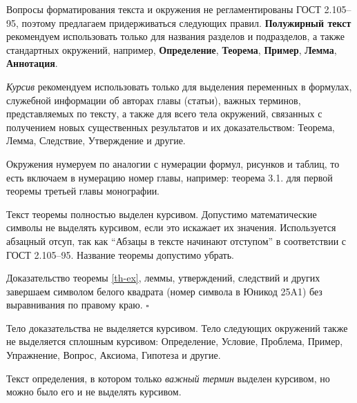 \begin{refsection}
Вопросы форматирования текста и окружения не регламентированы ГОСТ 2.105--95, поэтому предлагаем придерживаться следующих правил.
\textbf{Полужирный текст} рекомендуем использовать только для названия разделов и подразделов, а также стандартных окружений, например, \textbf{Определение}, \textbf{Теорема}, \textbf{Пример}, \textbf{Лемма}, \textbf{Аннотация}.


\textit{Курсив} рекомендуем использовать только для выделения переменных в формулах, служебной информации об авторах главы (статьи), важных терминов, представляемых по тексту, а также для всего тела окружений, связанных с получением новых существенных результатов и их доказательством: Теорема, Лемма, Следствие, Утверждение и другие.

Окружения нумеруем по аналогии с нумерации формул, рисунков и таблиц, то есть включаем в нумерацию номер главы, например:
теорема 3.1. для первой теоремы третьей главы монографии.  



\begin{thm}[о неполноте] %
	\label{th-ex} 
	Текст теоремы полностью выделен курсивом. Допустимо математические символы не выделять курсивом, если это искажает их значения. Используется абзацный отсуп, так как ``Абзацы в тексте начинают отступом'' в соответствии с ГОСТ 2.105--95. Название теоремы допустимо убрать.
\end{thm}
Доказательство теоремы \ref{th-ex}, леммы, утверждений, следствий и других завершаем символом белого квадрата (номер символа в Юникод 25A1) без выравнивания по правому краю. $\square$

Тело доказательства не выделяется курсивом.
Тело следующих окружений также не выделяется сплошным курсивом: Определение, Условие, Проблема, Пример, Упражнение, Вопрос, Аксиома, Гипотеза и другие.

\begin{defn}[хороший и-тест] %
	\label{def-ex}
	Текст определения, в котором только {\itshape важный термин} выделен курсивом, но можно было его и не выделять курсивом.
\end{defn}



\end{refsection}
